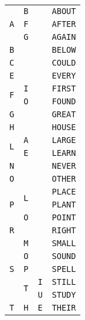 \documentclass[11pt]{amsart}
\begin{document}
\begin{tabular}{|ccc|c|}
\hline
\multirow{3}{*}{\texttt{A}} & \texttt{B} & & \texttt{ABOUT} \\
\cline{2-4}
                            & \texttt{F} & & \texttt{AFTER} \\
\cline{2-4}
                            & \texttt{G} & & \texttt{AGAIN} \\
\hline
\texttt{B} & & & \texttt{BELOW} \\
\hline
\texttt{C} & & & \texttt{COULD} \\
\hline
\texttt{E} & & & \texttt{EVERY} \\
\hline
\multirow{2}{*}{\texttt{F}} & \texttt{I} & & \texttt{FIRST} \\
\cline{2-4}
                            & \texttt{O} & & \texttt{FOUND} \\
\hline
\texttt{G} & & & \texttt{GREAT} \\
\hline
\texttt{H} & & & \texttt{HOUSE} \\
\hline
\multirow{2}{*}{\texttt{L}} & \texttt{A} & & \texttt{LARGE} \\
\cline{2-4}
                            & \texttt{E} & & \texttt{LEARN} \\
\hline
\texttt{N} & & & \texttt{NEVER} \\
\hline
\texttt{O} & & & \texttt{OTHER} \\
\hline
\multirow{3}{*}{\texttt{P}} & \multirow{2}{*}{\texttt{L}} & & \texttt{PLACE} \\
                            &                             & & \texttt{PLANT} \\
\cline{2-4}
                            & \texttt{O} & & \texttt{POINT} \\
\hline
\texttt{R} & & & \texttt{RIGHT} \\
\hline
\multirow{5}{*}{\texttt{S}} & \texttt{M} & & \texttt{SMALL} \\
\cline{2-4}
                            & \texttt{O} & & \texttt{SOUND} \\
\cline{2-4}
                            & \texttt{P} & & \texttt{SPELL} \\
\cline{2-4}
                            & \multirow{2}{*}{\texttt{T}}
                              & \texttt{I} & \texttt{STILL} \\
\cline{3-4}
                            & & \texttt{U} & \texttt{STUDY} \\
\hline
\multirow{6}{*}{\texttt{T}} & \multirow{6}{*}{\texttt{H}} &
    \multirow{3}{*}{\texttt{E}} & \texttt{THEIR} \\

\end{tabular}
\end{document}
